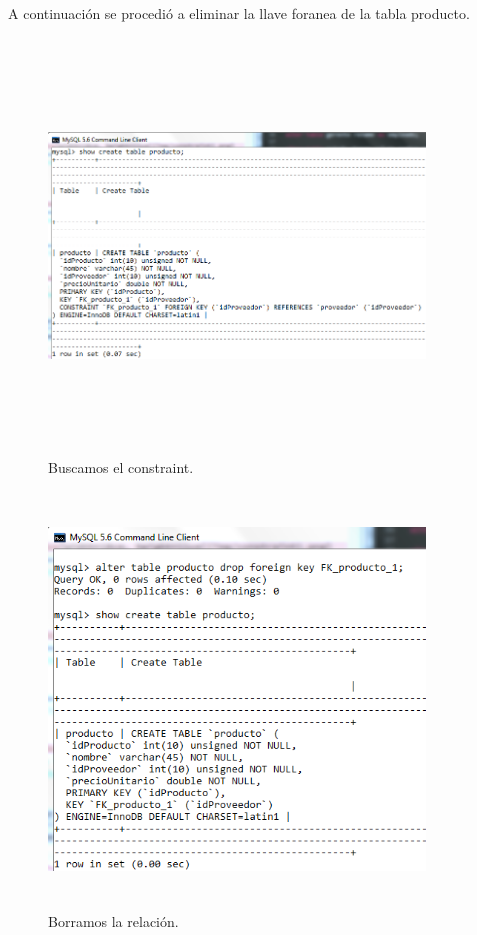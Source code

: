 \documentclass[12pt, titlepage]{article}
\begin{document}
A continuación se procedió a eliminar la llave foranea de la tabla producto.
\begin{figure}[H]
    \begin{center}
        \includegraphics[width=10cm, height=11cm]{img/constraint1.png}
        \caption{Buscamos el constraint.}
        \label{fig:arlter11}
    \end{center}
\end{figure}
\begin{figure}[H]
    \begin{center}
        \includegraphics[width=10cm, height=11cm]{img/constraint2.png}
        \caption{Borramos la relación.}
        \label{fig:arlter12}
    \end{center}
\end{figure}
\end{document}

